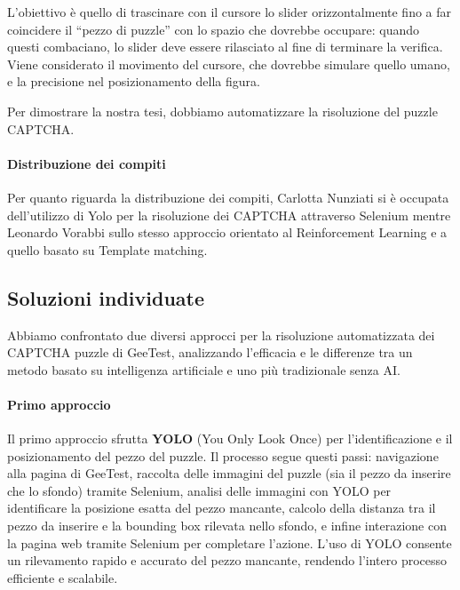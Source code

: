 \documentclass{article}
\begin{document}
L’obiettivo è quello di trascinare con il cursore lo slider orizzontalmente fino a far coincidere il “pezzo di puzzle” con lo spazio che dovrebbe occupare: quando questi combaciano, lo slider deve essere rilasciato al fine di terminare la verifica. Viene considerato il movimento del cursore, che dovrebbe simulare quello umano, e la precisione nel posizionamento della figura.

Per dimostrare la nostra tesi, dobbiamo automatizzare la risoluzione del puzzle CAPTCHA.

\paragraph{Distribuzione dei compiti}
Per quanto riguarda la distribuzione dei compiti, Carlotta Nunziati si è occupata dell’utilizzo di Yolo per la risoluzione dei CAPTCHA attraverso Selenium mentre Leonardo Vorabbi sullo stesso approccio orientato al Reinforcement Learning e a quello basato su Template matching.

\subsection{Soluzioni individuate}

Abbiamo confrontato due diversi approcci per la risoluzione automatizzata dei CAPTCHA puzzle di GeeTest, analizzando l’efficacia e le differenze tra un metodo basato su intelligenza artificiale e uno più tradizionale senza AI.

\paragraph{Primo approccio} Il primo approccio sfrutta \textbf{YOLO} (You Only Look Once) per l’identificazione e il posizionamento del pezzo del puzzle. Il processo segue questi passi: navigazione alla pagina di GeeTest, raccolta delle immagini del puzzle (sia il pezzo da inserire che lo sfondo) tramite Selenium, analisi delle immagini con YOLO per identificare la posizione esatta del pezzo mancante, calcolo della distanza tra il pezzo da inserire e la bounding box rilevata nello sfondo, e infine interazione con la pagina web tramite Selenium per completare l’azione. L’uso di YOLO consente un rilevamento rapido e accurato del pezzo mancante, rendendo l’intero processo efficiente e scalabile.
\end{document}

